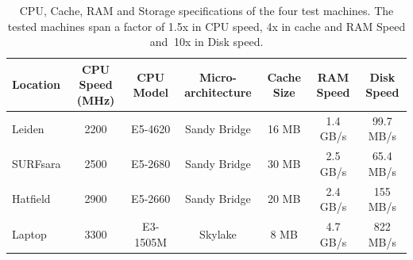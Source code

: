  \begin{table}
 \begin{center} 

  \begin{tabular}{ l | c | c | c | c | c | c }
    \hline
    Location & CPU Speed (MHz) & CPU Model & Micro-architecture & Cache Size & RAM Speed\footnotemark & Disk Speed\footnotemark \\ \hline
    \hline
    Leiden & 2200 & E5-4620 & Sandy Bridge & 16 MB  & 1.4 GB/s & 99.7 MB/s \\ \hline
    SURFsara & 2500 & E5-2680 & Sandy Bridge & 30 MB  & 2.5 GB/s & 65.4 MB/s \\ \hline
    Hatfield &  2900 & E5-2660 & Sandy Bridge  & 20 MB   & 2.4 GB/s & 155 MB/s\\ \hline
    Laptop & 3300 & E3-1505M & Skylake &  8 MB  & 4.7 GB/s & 822 MB/s\\ \hline
    \hline
  \end{tabular}   
  \caption{CPU, Cache, RAM and Storage specifications of the four test machines. The tested machines span a factor of 1.5x in CPU speed, 4x in cache and RAM Speed and $~$10x in Disk speed.}
  \label{tab:ch4_nodes}
  \end{center}
 \end{table}



